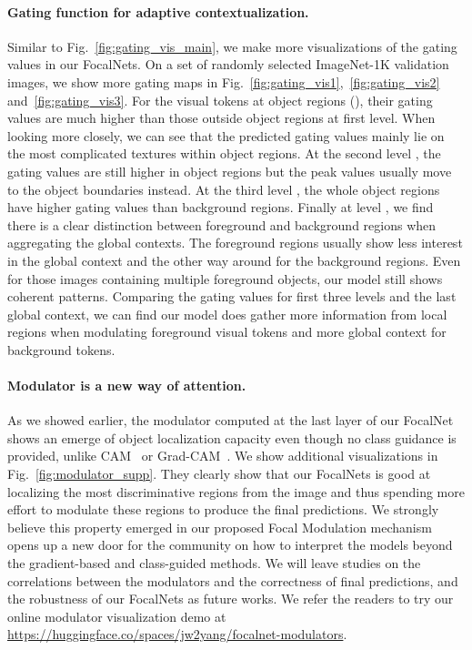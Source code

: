 \documentclass{article}
\begin{document}
\paragraph{Gating function for adaptive contextualization.} Similar to Fig.~\ref{fig:gating_vis_main}, we make more visualizations of the gating values in our FocalNets. On a set of randomly selected ImageNet-1K validation images, we show more gating maps in Fig.~\ref{fig:gating_vis1},~\ref{fig:gating_vis2} and~\ref{fig:gating_vis3}. For the visual tokens at object regions  (), their gating values are much higher than those outside object regions at first level. When looking more closely, we can see that the predicted gating values mainly lie on the most complicated textures within object regions. At the second level , the gating values are still higher in object regions but the peak values usually move to the object boundaries instead. At the third level  , the whole object regions have higher gating values than background regions. Finally at level , we find there is a clear distinction between foreground and background regions when aggregating the global contexts. The foreground regions usually show less interest in the global context and the other way around for the background regions. Even for those images containing multiple foreground objects, our model still shows coherent patterns. Comparing the gating values for first three levels and the last global context, we can find our model does gather more information from local regions when modulating foreground visual tokens and more global context for background tokens. 

\paragraph{Modulator is a new way of attention.} As we showed earlier, the modulator  computed at the last layer of our FocalNet shows an emerge of object localization capacity even though no class guidance is provided, unlike CAM~\cite{zhou2016learning} or Grad-CAM~\cite{selvaraju2017grad}. We show additional visualizations in Fig.~\ref{fig:modulator_supp}. They clearly show that our FocalNets is good at localizing the most discriminative regions from the image and thus spending more effort to modulate these regions to produce the final predictions. We strongly believe this property emerged in our proposed Focal Modulation mechanism opens up a new door for the community on how to interpret the models beyond the gradient-based and class-guided methods. We will leave studies on the correlations between the modulators and the correctness of final predictions, and the robustness of our FocalNets as future works. We refer the readers to try our online modulator visualization demo at \url{https://huggingface.co/spaces/jw2yang/focalnet-modulators}.
\end{document}
